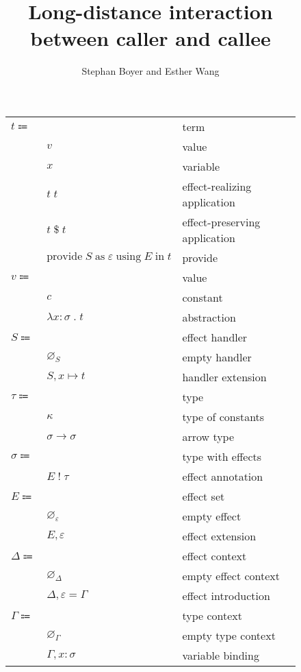\documentclass[12pt]{article}
\title{Long-distance interaction \\ between caller and callee}
\author{Stephan Boyer and Esther Wang}
\date{}
\newcommand\eterm{t}
\newcommand\evalue{v}
\newcommand\econst{c}
\newcommand\evar{x}
\newcommand\eabs[2]{\lambda #1 \; . \; #2} %
\newcommand\eapp[2]{#1 \; #2}
\newcommand\eappx[2]{#1 \; \$ \; #2}
\newcommand\eprovide[4]{\text{provide} \; #1 \; \text{as} \; #2 \; \text{using} \; #3 \; \text{in} \; #4}
\newcommand\pall{S}
\newcommand\pitem[2]{#1 \mapsto #2} %
\newcommand\pempty{\varnothing_{\pall}}
\newcommand\pextend[2]{#1, #2}
\newcommand\ttype{\tau}
\newcommand\tconst{\kappa}
\newcommand\tarrow[2]{#1 \rightarrow #2} %
\newcommand\tanno[2]{#1 : #2} %
\newcommand\tx{\sigma}
\newcommand\twithx[2]{#1 \; ! \; #2} %
\newcommand\xeffect{\varepsilon}
\newcommand\xeffects{E}
\newcommand\xempty{\varnothing_{\xeffect}}
\newcommand\xextend[2]{#1, #2}
\newcommand\xc{\Delta}
\newcommand\xcempty{\varnothing_{\xc}}
\newcommand\xcextend[2]{#1, #2}
\newcommand\xcitem[2]{#1 = #2}
\newcommand\ccontext{\Gamma}
\newcommand\cempty{\varnothing_{\ccontext}}
\newcommand\cextend[2]{#1, #2}
\begin{document}
  \maketitle

  \begin{figure}
    \begin{mdframed}
      \begin{center}
        \begin{tabular}{l l l}
          $\eterm \Coloneqq $ & & term \\
          & $\evalue$ & value \\
          & $\evar$ & variable \\
          & $\eapp{\eterm}{\eterm}$ & effect-realizing application \\
          & $\eappx{\eterm}{\eterm}$ & effect-preserving application \\
          & $\eprovide{\pall}{\xeffect}{\xeffects}{\eterm}$ & provide \\
          $\evalue \Coloneqq $ & & value \\
          & $\econst$ & constant \\
          & $\eabs{\tanno{\evar}{\tx}}{\eterm}$ & abstraction \\
          $\pall \Coloneqq$ & & effect handler \\
          & $\pempty$ & empty handler \\
          & $\pextend{\pall}{\pitem{\evar}{\eterm}}$ & handler extension \\
          $\ttype \Coloneqq$ & & type \\
          & $\tconst$ & type of constants \\
          & $\tarrow{\tx}{\tx}$ & arrow type \\
          $\tx \Coloneqq$ & & type with effects \\
          & $\twithx{\xeffects}{\ttype}$ & effect annotation \\
          $\xeffects \Coloneqq$ & & effect set \\
          & $\xempty$ & empty effect \\
          & $\xextend{\xeffects}{\xeffect}$ & effect extension \\
          $\xc \Coloneqq$ & & effect context \\
          & $\xcempty$ & empty effect context \\
          & $\xcextend{\xc}{\xcitem{\xeffect}{\ccontext}}$ & effect introduction \\
          $\ccontext \Coloneqq$ & & type context \\
          & $\cempty$ & empty type context \\
          & $\cextend{\ccontext}{\tanno{\evar}{\tx}}$ & variable binding \\
        \end{tabular}
      \end{center}


\end{mdframed}
\end{figure}
\end{document}
